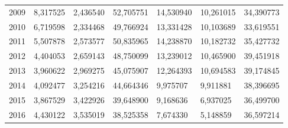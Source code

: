 \begin{table}
\begin{tabular}{p{1cm}p{2cm}p{2cm}p{2cm}p{2cm}p{2cm}p{2cm}}
 2009 &                        8,317525 &  2,436540 &                                   52,705751 &                                14,530940 &                        10,261015 &                           34,390773 \\
 2010 &                        6,719598 &  2,334468 &                                   49,766924 &                                13,331428 &                        10,103689 &                           33,619551 \\
 2011 &                        5,507878 &  2,573577 &                                   50,835965 &                                14,238870 &                        10,182732 &                           35,427732 \\
 2012 &                        4,404053 &  2,659143 &                                   48,750099 &                                13,239012 &                        10,465900 &                           39,451918 \\
 2013 &                        3,960622 &  2,969275 &                                   45,075907 &                                12,264393 &                        10,694583 &                           39,174845 \\
 2014 &                        4,092477 &  3,254216 &                                   44,664346 &                                 9,975707 &                         9,911881 &                           38,396695 \\
 2015 &                        3,867529 &  3,422926 &                                   39,648900 &                                 9,168636 &                         6,937025 &                           36,499700 \\
 2016 &                        4,430122 &  3,535019 &                                   38,525358 &                                 7,674330 &                         5,148859 &                           36,597214 \\
\bottomrule
\end{tabular}
\end{table}
